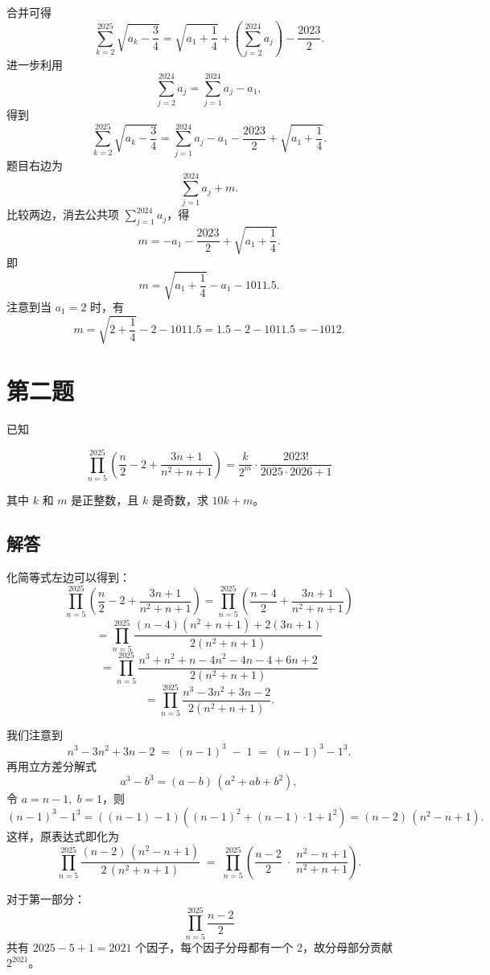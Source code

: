 \documentclass[12pt, a4paper]{article}
\theoremstyle{definition}
\theoremstyle{remark}
\begin{document}
\noindent 合并可得
$$
\sum_{k=2}^{2025} \sqrt{a_k-\frac{3}{4}}=\sqrt{a_1+\frac{1}{4}}+\left(\sum_{j=2}^{2024} a_j\right)-\frac{2023}{2}.
$$
进一步利用
$$
\sum_{j=2}^{2024} a_j=\sum_{j=1}^{2024} a_j-a_1,
$$
得到
$$
\sum_{k=2}^{2025} \sqrt{a_k-\frac{3}{4}}=\sum_{j=1}^{2024} a_j-a_1-\frac{2023}{2}+\sqrt{a_1+\frac{1}{4}}.
$$
题目右边为
$$
\sum_{j=1}^{2024} a_j+m.
$$
比较两边，消去公共项 $\sum_{j=1}^{2024} a_j$，得
$$
m=-a_1-\frac{2023}{2}+\sqrt{a_1+\frac{1}{4}}.
$$
即
$$
m=\sqrt{a_1+\frac{1}{4}}-a_1-1011.5.
$$
注意到当 $a_1=2$ 时，有
$$
m=\sqrt{2+\frac{1}{4}}-2-1011.5=1.5-2-1011.5=-1012.
$$

\newpage

\section{第二题}

\noindent 已知

$$
\prod_{n=5}^{2025}\left(\frac{n}{2}-2+\frac{3 n+1}{n^2+n+1}\right)=\frac{k}{2^m} \cdot \frac{2023!}{2025 \cdot 2026+1}
$$

\noindent 其中 $k$ 和 $m$ 是正整数，且 $k$ 是奇数，求 $10k+m$。

\subsection{解答}

\noindent 化简等式左边可以得到：
$$
\prod_{n=5}^{2025} \left( \frac{n}{2} - 2 + \frac{3n+1}{n^2+n+1} \right)
= \prod_{n=5}^{2025} \left( \frac{n-4}{2} + \frac{3n+1}{n^2+n+1} \right)
$$
$$
= \prod_{n=5}^{2025} \frac{(n-4)(n^2+n+1) + 2(3n+1)}{2(n^2+n+1)}
$$
$$
= \prod_{n=5}^{2025} \frac{n^3 + n^2 + n - 4n^2 - 4n - 4 + 6n + 2}{2(n^2+n+1)} 
$$
$$
= \prod_{n=5}^{2025} \frac{n^3 - 3n^2 + 3n - 2}{2(n^2+n+1)}.
$$

\noindent 我们注意到
$$
n^3 -3n^2 +3n -2 \;=\; (n-1)^3 \;-\;1 
\;=\; (n-1)^3 - 1^3.
$$
再用立方差分解式
$$
a^3 - b^3 = (a - b)\,(a^2 + ab + b^2),
$$
令 \(a=n-1,\; b=1\)，则
$$
(n-1)^3 - 1^3 
= \left((n-1)-1\right)\left((n-1)^2 + (n-1)\cdot 1 + 1^2\right) 
= (n-2)\,\left(n^2 -n +1\right).
$$
这样，原表达式即化为
$$
\prod_{n=5}^{2025} \frac{(n-2)\,(n^2 - n +1)}{2\,(n^2 + n +1)} 
\;=\; \prod_{n=5}^{2025} \left( \frac{n-2}{2}\;\cdot\;\frac{n^2 - n +1}{n^2 + n +1} \right).
$$

\noindent 对于第一部分：
$$
\prod_{n=5}^{2025} \frac{n-2}{2}
$$
共有 \(2025 - 5 + 1 = 2021\) 个因子，每个因子分母都有一个 2，故分母部分贡献 \(2^{2021}\)。
\end{document}
